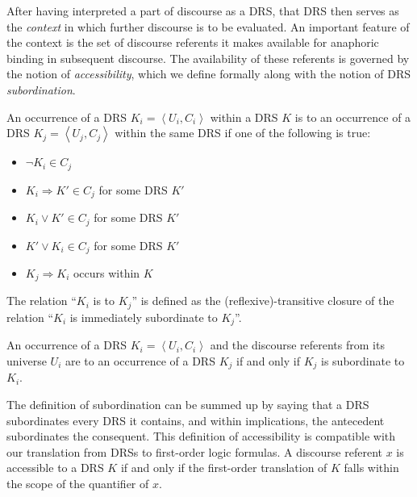 After having interpreted a part of discourse as a DRS, that DRS then serves
as the \emph{context} in which further discourse is to be evaluated. An
important feature of the context is the set of discourse referents it makes
available for anaphoric binding in subsequent discourse. The availability
of these referents is governed by the notion of \emph{accessibility}, which
we define formally along with the notion of DRS
\emph{subordination}.

\begin{definition}
  An occurrence of a DRS $K_i = \left< U_i, C_i \right>$ within a DRS $K$
  is  to an occurrence of a DRS
  $K_j = \left< U_j, C_j \right>$ within the same DRS if one of the
  following is true:

  \begin{itemize}
  \item $\lnot K_i \in C_j$
  \item $K_i \Rightarrow K' \in C_j$ for some DRS $K'$
  \item $K_i \lor K' \in C_j$ for some DRS $K'$
  \item $K' \lor K_i \in C_j$ for some DRS $K'$
  \item $K_j \Rightarrow K_i$ occurs within $K$
  \end{itemize}
\end{definition}

\begin{definition}
  The relation ``$K_i$ is  to $K_j$'' is
  defined as the (reflexive)-transitive closure of the relation ``$K_i$ is
  immediately subordinate to $K_j$''.
\end{definition}

\begin{definition}
  An occurrence of a DRS $K_i = \left< U_i, C_i \right>$ and the discourse
  referents from its universe $U_i$ are  to an occurrence
  of a DRS $K_j$ if and only if $K_j$ is subordinate to $K_i$.
\end{definition}

The definition of subordination can be summed up by saying that a DRS
subordinates every DRS it contains, and within implications, the antecedent
subordinates the consequent. This definition of accessibility is compatible
with our translation from DRSs to first-order logic formulas. A discourse
referent $x$ is accessible to a DRS $K$ if and only if the first-order
translation of $K$ falls within the scope of the quantifier of $x$.

